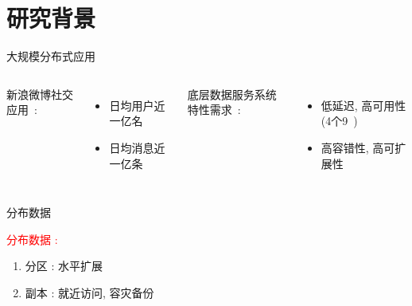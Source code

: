 \section{研究背景}

\begin{frame}{大规模分布式应用}
  \vspace{0.50cm}

  \begin{columns}
	新浪微博社交应用~\footnotemark:
	\begin{itemize}
	  \item 日均用户近一亿名
	  \item 日均消息近一亿条
	\end{itemize}
	\pause
	底层数据服务系统特性需求~: 
	\begin{itemize}
	  \item 低延迟, 高可用性 (4个9~\footnotemark)
	  \item 高容错性, 高可扩展性
	\end{itemize}
  \end{columns}
  
\end{frame}
\begin{frame}{分布数据}
  \graphicspath{{tikz-in-beamer/}}
  \begin{figure}[h!]
    \centering
    \begin{adjustbox}{max totalsize = {0.50\textwidth}{1.00\textheight}, center}
	  
    \end{adjustbox}
  \end{figure}

  \textcolor{red}{分布数据 :}
  \begin{enumerate}
	\item<2-> 分区 : 水平扩展
	\item<3-> 副本 : 就近访问, 容灾备份
  \end{enumerate}
\end{frame}
